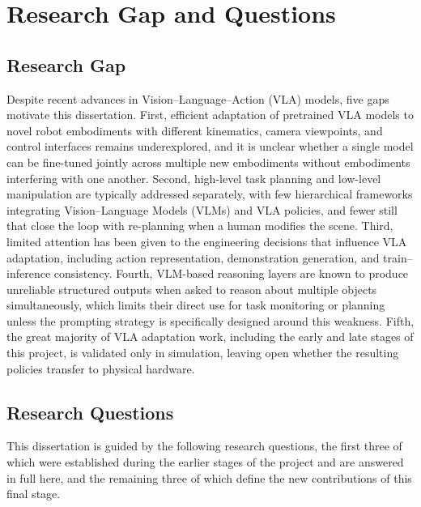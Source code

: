 \documentclass[12pt]{article}
\begin{document}
\section{Research Gap and Questions}
\label{sec:gap}

\subsection{Research Gap}

Despite recent advances in Vision--Language--Action (VLA) models, five gaps motivate this dissertation. First, efficient adaptation of pretrained VLA models to novel robot embodiments with different kinematics, camera viewpoints, and control interfaces remains underexplored, and it is unclear whether a single model can be fine-tuned jointly across multiple new embodiments without embodiments interfering with one another. Second, high-level task planning and low-level manipulation are typically addressed separately, with few hierarchical frameworks integrating Vision--Language Models (VLMs) and VLA policies, and fewer still that close the loop with re-planning when a human modifies the scene. Third, limited attention has been given to the engineering decisions that influence VLA adaptation, including action representation, demonstration generation, and train--inference consistency. Fourth, VLM-based reasoning layers are known to produce unreliable structured outputs when asked to reason about multiple objects simultaneously, which limits their direct use for task monitoring or planning unless the prompting strategy is specifically designed around this weakness. Fifth, the great majority of VLA adaptation work, including the early and late stages of this project, is validated only in simulation, leaving open whether the resulting policies transfer to physical hardware.

\subsection{Research Questions}

This dissertation is guided by the following research questions, the first three of which were established during the earlier stages of the project and are answered in full here, and the remaining three of which define the new contributions of this final stage.
\end{document}
